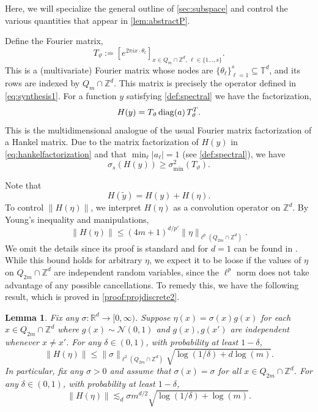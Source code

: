 \documentclass[11pt]{article}
\newtheorem{lemma}[theorem]{Lemma}
\theoremstyle{definition}
\numberwithin{theorem}{section}
\numberwithin{lemma}{section}
\numberwithin{equation}{section}
\def\R{\mathbb{R}}
\def\T{\mathbb{T}}
\def\Z{\mathbb{Z}}
\renewcommand{\subset}{\subseteq}
\renewcommand{\tilde}{\widetilde}
\newcommand{\bfa}{a}
\newcommand{\calN}{\mathcal{N}}
\newcommand{\diag}{{\rm diag}}
\numberwithin{equation}{section}
\begin{document}
	Here, we will specialize the general outline of \cref{sec:subspace} and control the various quantities that appear in \cref{lem:abstractP}. 

	Define the Fourier matrix,
		\begin{equation}
			\label{eq:fouriermatrixcube}
			T_\vartheta:=\left[ e^{2\pi i x \cdot \theta_\ell}\right]_{x\in Q_m\cap\Z^d, \, \ell \in \{1\dots,s\}}.
		\end{equation}
		This is a (multivariate) Fourier matrix whose nodes are $\{\theta_\ell\}_{\ell=1}^s\subset\T^d$, and its rows are indexed by $Q_m\cap\Z^d$. This matrix is precisely the operator defined in \eqref{eq:synthesis1}. 		
	For a function $y$ satisfying \cref{def:spectral} we have the factorization,
	\begin{equation}\label{eq:hankelfactorization}
		H(y) = T_\vartheta \, \diag(\bfa) \, T_\vartheta^T.
	\end{equation}
	This is the multidimensional analogue of the usual Fourier matrix factorization of a Hankel matrix. 
	Due to the matrix factorization of $H(y)$ in  \eqref{eq:hankelfactorization} and that $\min_\ell |a_\ell|= 1$ (see \cref{def:spectral}), we have
	\begin{equation}
		\label{eq:sigsH}
		\sigma_s(H(y))
		\geq \sigma_{\min}^2(T_\vartheta).
	\end{equation}
	
Note that
	$$
	H(\tilde y)=H(y)+H(\eta). 
	$$	To control $\|H(\eta)\|$, we interpret $H(\eta)$ as a convolution operator on $\Z^d$. By Young's inequality and manipulations, 
	\begin{equation} \label{eq:projdiscrete1}
		\|H(\eta)\|
		\leq (4m+1)^{d/p'} \|\eta\|_{\ell^p(Q_{2m}\cap\Z^d)}.
	\end{equation} 
	We omit the details since its proof is standard and for $d=1$ can be found in \cite[Lemma 5.7]{fannjiang2025optimality}. While this bound holds for arbitrary $\eta$, we expect it to be loose if the values of $\eta$ on $Q_{2m}\cap\Z^d$ are independent random variables, since the $\ell^p$ norm does not take advantage of any possible cancellations. To remedy this, we have the following result, which is proved in \cref{proof:projdiscrete2}. 	
	
	\begin{lemma}
		\label{lem:projdiscrete2}
		Fix any $\sigma\colon \R^d\to [0,\infty)$. Suppose $\eta(x)=\sigma(x)g(x)$ for each $x\in Q_{2m}\cap \Z^d$ where $g(x)\sim\calN(0,1)$ and $g(x),g(x')$ are independent whenever $x\ne x'$. For any $\delta\in (0,1)$, with probability at least $1-\delta$,
		\begin{equation*}
			\|H(\eta)\|
			\leq \|\sigma\|_{\ell^2(Q_{2m}\cap \Z^d)} \sqrt{ \log(1/\delta)+ d \log(m)}. 
		\end{equation*}
		In particular, fix any $\sigma>0$ and assume that $\sigma(x)=\sigma$ for all $x\in Q_{2m}\cap \Z^d$. For any $\delta\in (0,1)$, with probability at least $1-\delta$,
		$$
		\|H(\eta)\|
		\lesssim_d \sigma m^{d/2} \sqrt{ \log(1/\delta)+ \log(m)}.
		$$
	\end{lemma}
	    
\end{document}
